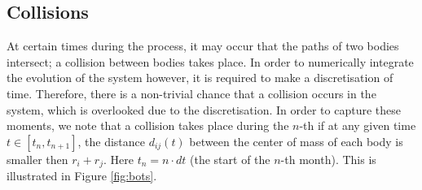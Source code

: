 \subsection{Collisions}
At certain times during the process, it may occur that the paths of two bodies intersect; a collision between bodies takes place. In order to numerically integrate the evolution of the system however, it is required to make a discretisation of time.
 Therefore, there is a non-trivial chance that a collision occurs in the system, which is overlooked due to the discretisation.
 In order to capture these moments, we note that a collision takes place during the \(n\)-th if at any given time \(t\in[t_{n},t_{n+1}]\), the distance \(d_{ij}(t)\) between the center of mass of each body is smaller then \(r_i+r_j\). 
 Here \(t_n=n\cdot dt\) (the start of the \(n\)-th month). This is illustrated in Figure \ref{fig:bots}.
 
